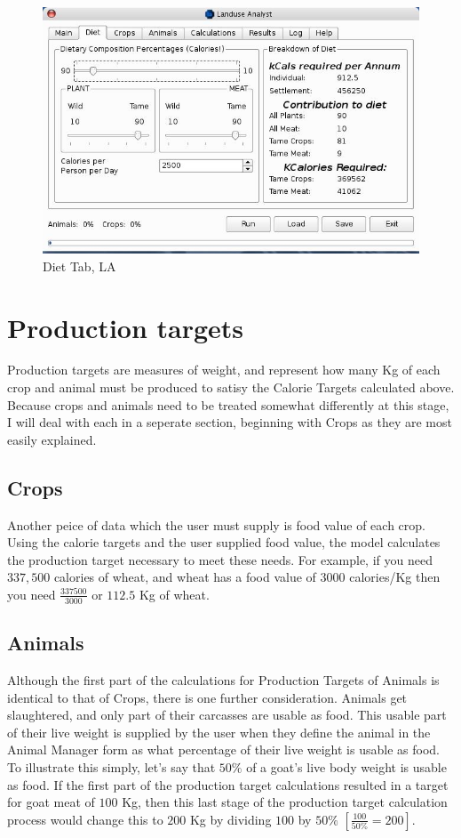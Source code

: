 \begin{figure}[htbp]
  \label{fig:LADiet}%
    \includegraphics[scale=.4]{./images/LanduseAnalystDiet545.jpg}
  \caption{ Diet Tab, LA}
\end{figure}

\section{Production targets}
  Production targets are measures of weight, and represent how many Kg of each crop and animal must be produced to satisy the Calorie Targets calculated above.  Because crops and animals need to be treated somewhat differently at this stage, I will deal with each in a seperate section, beginning with Crops as they are most easily explained.

  \subsection{Crops}
  Another peice of data which the user must supply is food value of each crop.  Using the calorie targets and the user supplied food value, the model calculates the production target necessary to meet these needs.  For example, if you need $337,500$ calories of wheat, and wheat has a food value of $3000$ calories/Kg then you need $\frac{337500}{3000}$ or $112.5$ Kg of wheat.

  \subsection{Animals}
  Although the first part of the calculations for Production Targets of Animals is identical to that of Crops, there is one further consideration.  Animals get slaughtered, and only part of their carcasses are usable as food.  This usable part of their live weight is supplied by the user when they define the animal in the Animal Manager form as what percentage of their live weight is usable as food.  To illustrate this simply, let's say that $50\%$ of a goat's live body weight is usable as food.  If the first part of the production target calculations resulted in a target for goat meat of $100$ Kg, then this last stage of the production target calculation process would change this to $200$ Kg by dividing $100$ by $50\%$   $\left[ \frac{100}{50\%}=200\right]$.

